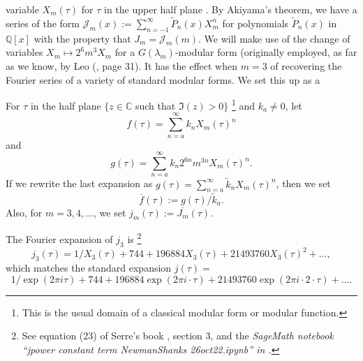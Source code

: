 \documentclass{article}
\begin{document}
variable $X_m(\tau)$ 
for $\tau$ in the upper half 
plane \cite{interpolating}.
By Akiyama's theorem, we have a
series of the form
$\mathcal{J}_m(x) := 
\sum_{n=-1}^{\infty} \tilde{P}_n(x)X_m^n$
for polynomials $\tilde{P}_n(x)$ 
in $\mathbb{Q}[x]$
with the property that 
$J_m = \mathcal{J}_m(m)$.
We will make use of the change of
variables  $X_m \mapsto 2^6 m^3 X_m$ for a 
$G(\lambda_m)$-modular form (originally employed,
as far as we know, by Leo (\cite{leo2008fourier},
page 31). It has the effect when $m=3$
of recovering the Fourier series
of a variety of standard 
modular forms. We set this up as a 
\begin{definition}
For $\tau$ in the half plane
$\{z \in \mathbb{C}$ such that $\Im(z) >0\}$
\footnote{This is the usual domain of a
classical modular form or modular function.}
and $k_a \neq 0$, let 
$$
f(\tau) = \sum_{n=a}^{\infty} k_n X_m(\tau)^n
$$
and
$$
g(\tau) = \sum_{n=a}^{\infty} k_n 2^{6n} m^{3n} 
X_m(\tau)^n.
$$
If we rewrite the last expansion as 
$g(\tau)  = \sum_{n=a}^{\infty} \tilde{k}_n X_m(\tau)^n$,
then we set
$$\overline{f}(\tau) := g(\tau)/\tilde{k}_a.$$
Also, for $m  = 3, 4, ...$,
we set $j_m(\tau) := \overline{J_m}(\tau)$.
\end{definition} \noindent
The Fourier expansion of $j_3$
is 
\footnote{
See equation (23) of 
Serre's book 
\cite{serre1970course}, 
section 3, and the \it SageMath \rm notebook 
``jpower constant term NewmanShanks 26oct22.ipynb''
in 
\cite{githubNewmanShanks}.
}
$$j_3(\tau) = 
1/X_3(\tau) + 744 + 196884 X_3(\tau) + 
21493760 X_3(\tau)^2 + ...,
$$
which matches the  standard expansion $j(\tau) = $
$$
1/\exp(2\pi i \tau) + 744 + 
196884 \exp(2\pi i \cdot  \tau) + 
21493760 \exp(2\pi i\cdot  2 \cdot \tau ) + ....
$$
\end{document}

